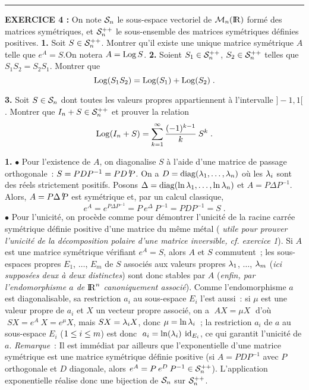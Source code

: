\documentclass{article}
\begin{document}
\bsk
\hrule
\bsk

{\bf EXERCICE 4 :}\msk
On note ${\cal S}_n$ le sous-espace vectoriel de ${\cal M}_{n}({\rm I\kern-0.6mm R})$ form\'e des matrices
sym\'etriques, et ${\cal S}_{n}^{++}$ le sous-ensemble des matrices sym\'etriques
d\'efinies positives.\msk
{\bf 1.} Soit $S\in{\cal S}_{n}^{++}$. Montrer qu'il existe une unique matrice
sym\'etrique $A$ telle que $e^A=S$.\break On notera $A=\mathop{\rm Log}\nolimits S$.
\msk
{\bf 2.} Soient $S_1\in{\cal S}_{n}^{++}$, $S_2\in{\cal S}_{n}^{++}$ telles que $S_1S_2=S_2S_1$.
Montrer que\vv
$$\mathop{\rm Log}\nolimits(S_1S_2)=\mathop{\rm Log}\nolimits(S_1)+\mathop{\rm Log}\nolimits(S_2)\;.$$\par
{\bf 3.} Soit $S\in{\cal S}_n$ dont toutes les valeurs propres appartiennent
\`a l'intervalle $]-1,1[$. Montrer que $I_n+S\in{\cal S}_{n}^{++}$ et prouver la relation\vv
$$\mathop{\rm Log}\nolimits(I_n+S)=\sum_{k=1}^{\infty}{(-1)^{k-1}\over k}\>S^k\;.$$

\msk
\cl{- - - - - - - - - - - - - - - - - - - - - - - - - - - - - - -}
\msk

{\bf 1.} $\bullet$ Pour l'existence de $A$, on diagonalise $S$ \`a l'aide d'une matrice
de passage orthogonale~: $S=PDP^{-1}=PD\,{}^t\!\! P$.
On a $D=\mathop{\rm diag}\nolimits(\lambda_1,\ldots,\lambda_n)$ o\`u les $\lambda_i$ sont des r\'eels
strictement positifs. Posons $\Delta=\mathop{\rm diag}\nolimits(\ln\lambda_1,\ldots,\ln\lambda_n)$ et
$A=P\Delta P^{-1}$. Alors, $A=P\Delta \,{}^t\!\! P$ est sym\'etrique et,
par un calcul classique,\vv
$$e^A=e^{P\Delta P^{-1}}=P\>e^{\Delta}\>P^{-1}=PDP^{-1}=S\;.$$\sect
$\bullet$ Pour l'unicit\'e, on proc\`ede comme pour d\'emontrer l'unicit\'e de la
racine carr\'ee sym\'etrique d\'efinie positive d'une matrice du m\^eme m\'etal ({\it
utile pour prouver l'unicit\'e de la d\'ecomposition polaire d'une matrice inversible,
cf. exercice 1}). Si $A$ est une matrice sym\'etrique v\'erifiant $e^A=S$, alors $A$ et
$S$ commutent~; les sous-espaces propres $E_1$, $\ldots$, $E_m$ de $S$
associ\'es aux valeurs propres $\lambda_1$, $\ldots$, $\lambda_m$ ({\it ici suppos\'ees
deux \`a deux distinctes}) sont donc stables par $A$ ({\it enfin, par l'endomorphisme
$a$ de ${\rm I\kern-0.6mm R}^n$ canoniquement associ\'e}). Comme l'endomorphisme $a$ est
diagonalisable, sa restriction $a_i$ au sous-espace $E_i$ l'est aussi~: si $\mu$
est une valeur propre de $a_i$ et $X$ un vecteur propre associ\'e, on a
$\;AX=\mu X\;$ d'o\`u $\;SX=e^A\>X=e^{\mu}X$, mais $SX=\lambda_iX$, donc $\mu=\ln\lambda_i$~;
la restriction $a_i$ de $a$ au sous-espace $E_i$ ($1\leq i\leq m$) est donc
$\;a_i=\ln(\lambda_i)\>\mathop{\rm id}\nolimits_{E_i}$, ce qui garantit l'unicit\'e de $a$.
\msk\sect
{\it Remarque}~: Il est imm\'ediat par ailleurs que l'exponentielle d'une matrice
sym\'etrique est une matrice sym\'etrique d\'efinie positive (si $A=PDP^{-1}$ avec
$P$ orthogonale et $D$ diagonale, alors $e^A=P\>e^D\>P^{-1}\in{\cal S}_{n}^{++}$).
L'application exponentielle r\'ealise donc une bijection de ${\cal S}_n$
sur ${\cal S}_{n}^{++}$.
\end{document}
